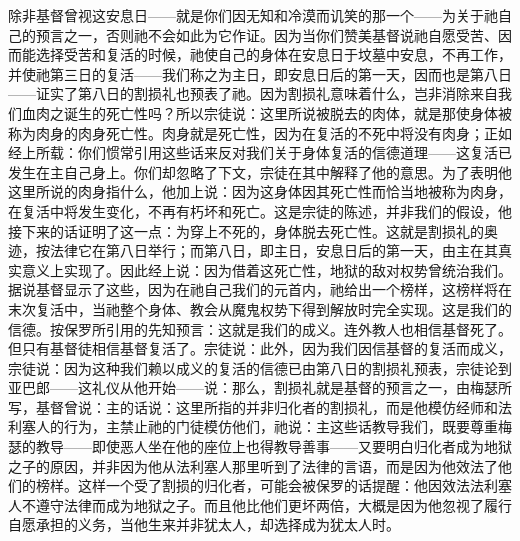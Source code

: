 除非基督曾视这安息日——就是你们因无知和冷漠而讥笑的那一个——为关于祂自己的预言之一，否则祂不会如此为它作证。因为当你们赞美基督说祂自愿受苦、因而能选择受苦和复活的时候，祂使自己的身体在安息日于坟墓中安息，不再工作，并使祂第三日的复活——我们称之为主日，即安息日后的第一天，因而也是第八日——证实了第八日的割损礼也预表了祂。因为割损礼意味着什么，岂非消除来自我们血肉之诞生的死亡性吗？所以宗徒说：这里所说被脱去的肉体，就是那使身体被称为肉身的肉身死亡性。肉身就是死亡性，因为在复活的不死中将没有肉身；正如经上所载：你们惯常引用这些话来反对我们关于身体复活的信德道理——这复活已发生在主自己身上。你们却忽略了下文，宗徒在其中解释了他的意思。为了表明他这里所说的肉身指什么，他加上说：因为这身体因其死亡性而恰当地被称为肉身，在复活中将发生变化，不再有朽坏和死亡。这是宗徒的陈述，并非我们的假设，他接下来的话证明了这一点：为穿上不死的，身体脱去死亡性。这就是割损礼的奥迹，按法律它在第八日举行；而第八日，即主日，安息日后的第一天，由主在其真实意义上实现了。因此经上说：因为借着这死亡性，地狱的敌对权势曾统治我们。据说基督显示了这些，因为在祂自己我们的元首内，祂给出一个榜样，这榜样将在末次复活中，当祂整个身体、教会从魔鬼权势下得到解放时完全实现。这是我们的信德。按保罗所引用的先知预言：这就是我们的成义。连外教人也相信基督死了。但只有基督徒相信基督复活了。宗徒说：此外，因为我们因信基督的复活而成义，宗徒说：因为这种我们赖以成义的复活的信德已由第八日的割损礼预表，宗徒论到亚巴郎——这礼仪从他开始——说：那么，割损礼就是基督的预言之一，由梅瑟所写，基督曾说：主的话说：这里所指的并非归化者的割损礼，而是他模仿经师和法利塞人的行为，主禁止祂的门徒模仿他们，祂说：主这些话教导我们，既要尊重梅瑟的教导——即使恶人坐在他的座位上也得教导善事——又要明白归化者成为地狱之子的原因，并非因为他从法利塞人那里听到了法律的言语，而是因为他效法了他们的榜样。这样一个受了割损的归化者，可能会被保罗的话提醒：他因效法法利塞人不遵守法律而成为地狱之子。而且他比他们更坏两倍，大概是因为他忽视了履行自愿承担的义务，当他生来并非犹太人，却选择成为犹太人时。\par

